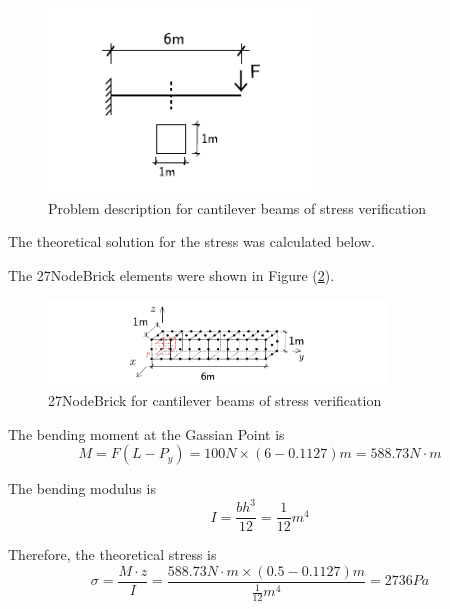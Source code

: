 \documentclass[fleqn,11pt]{article}
\begin{document}
\begin{figure}[H]
  \centering
  \includegraphics[width=7cm]{../Figure-files/cantilever_6.pdf}
  \caption{Problem description for cantilever beams of stress verification}
  \label{fig Problem description for cantilever beams of stress verification 27}
\end{figure}

The theoretical solution for the stress was calculated below. 





The 27NodeBrick elements were shown in Figure (\ref{fig 27NodeBrick for cantilever beams of stress verification}).

\begin{figure}[H]
  \centering
  \includegraphics[width=9cm]{../Figure-files/beam_27brick_6div_gp.pdf}
  \caption{27NodeBrick for cantilever beams of stress verification}
  \label{fig 27NodeBrick for cantilever beams of stress verification}
\end{figure}

The bending moment at the Gassian Point is 
\begin{equation}
  M=F(L-P_y)=100 N \times (6-0.1127) m = 588.73 N\cdot m
\end{equation}

The bending modulus is 
\begin{equation}
  I= \frac{bh^3}{12}=\frac{1}{12} m^4
\end{equation}

Therefore, the theoretical stress is 
\begin{equation}
  \sigma= \frac{M\cdot z}{I}= \frac{588.73 N\cdot m \times (0.5-0.1127) m }{\frac{1}{12} m^4}= 2736 Pa
\end{equation}
\end{document}
